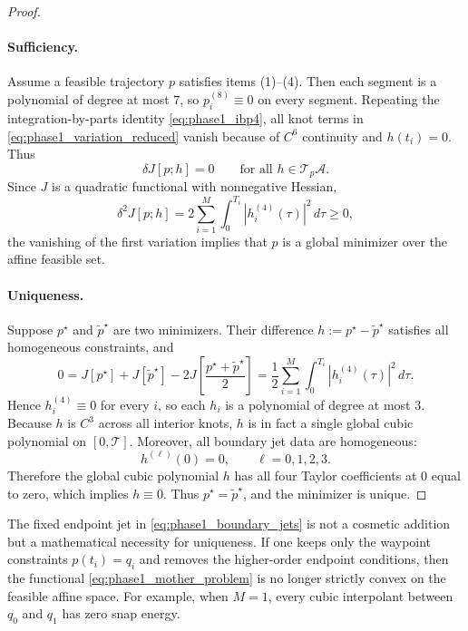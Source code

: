 \begin{proof}
  \paragraph{Sufficiency.}
  Assume a feasible trajectory $p$ satisfies items (1)--(4). Then each segment is a polynomial of
  degree at most $7$, so $p_i^{(8)}\equiv 0$ on every segment. Repeating the integration-by-parts
  identity \eqref{eq:phase1_ibp4}, all knot terms in \eqref{eq:phase1_variation_reduced} vanish
  because of $C^6$ continuity and $h(t_i)=0$. Thus
  \[
    \delta J[p;h]=0
    \qquad
    \text{for all } h\in \mathcal T_p\mathcal A .
  \]
  Since $J$ is a quadratic functional with nonnegative Hessian,
  \[
    \delta^2 J[p;h]
    =
    2\sum_{i=1}^{M}\int_{0}^{T_i}|h_i^{(4)}(\tau)|^2\,d\tau
    \ge 0,
  \]
  the vanishing of the first variation implies that $p$ is a global minimizer over the affine feasible
  set.

  \paragraph{Uniqueness.}
  Suppose $p^\star$ and $\tilde p^\star$ are two minimizers. Their difference
  $h:=p^\star-\tilde p^\star$ satisfies all homogeneous constraints, and
  \[
    0
    =
    J[p^\star]+J[\tilde p^\star]-2J\!\left[\frac{p^\star+\tilde p^\star}{2}\right]
    =
    \frac{1}{2}\sum_{i=1}^{M}\int_{0}^{T_i}|h_i^{(4)}(\tau)|^2\,d\tau.
  \]
  Hence $h_i^{(4)}\equiv 0$ for every $i$, so each $h_i$ is a polynomial of degree at most $3$.
  Because $h$ is $C^3$ across all interior knots, $h$ is in fact a single global cubic polynomial on
  $[0,\mathcal T]$. Moreover, all boundary jet data are homogeneous:
  \[
    h^{(\ell)}(0)=0,\qquad \ell=0,1,2,3.
  \]
  Therefore the global cubic polynomial $h$ has all four Taylor coefficients at $0$ equal to zero,
  which implies $h\equiv 0$. Thus $p^\star=\tilde p^\star$, and the minimizer is unique.
\end{proof}

\begin{remark}
  \label{rem:phase1_endpoint_jet}
  The fixed endpoint jet in \eqref{eq:phase1_boundary_jets} is not a cosmetic addition but a
  mathematical necessity for uniqueness. If one keeps only the waypoint constraints
  $p(t_i)=q_i$ and removes the higher-order endpoint conditions, then the functional
  \eqref{eq:phase1_mother_problem} is no longer strictly convex on the feasible affine space.
  For example, when $M=1$, every cubic interpolant between $q_0$ and $q_1$ has zero snap energy.
\end{remark}

